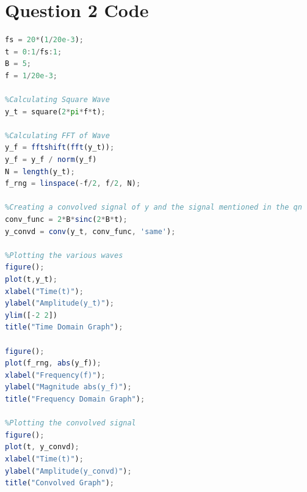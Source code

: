 \documentclass{article}
\begin{document}
	\newpage

	\section{Question 2 Code}
	\label{app:question 2 code}
	\begin{lstlisting}[language=Octave]
%Defining Variables
fs = 20*(1/20e-3);
t = 0:1/fs:1;
B = 5;
f = 1/20e-3;

%Calculating Square Wave
y_t = square(2*pi*f*t);

%Calculating FFT of Wave
y_f = fftshift(fft(y_t));
y_f = y_f / norm(y_f)
N = length(y_t);
f_rng = linspace(-f/2, f/2, N);

%Creating a convolved signal of y and the signal mentioned in the qn
conv_func = 2*B*sinc(2*B*t);
y_convd = conv(y_t, conv_func, 'same');

%Plotting the various waves
figure();
plot(t,y_t);
xlabel("Time(t)");
ylabel("Amplitude(y_t)");
ylim([-2 2])
title("Time Domain Graph");

figure();
plot(f_rng, abs(y_f));
xlabel("Frequency(f)");
ylabel("Magnitude abs(y_f)");
title("Frequency Domain Graph");

%Plotting the convolved signal
figure();
plot(t, y_convd);
xlabel("Time(t)");
ylabel("Amplitude(y_convd)");
title("Convolved Graph");
	\end{lstlisting}
	
\end{document}
